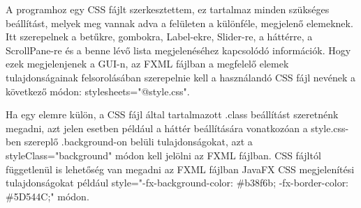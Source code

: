 A programhoz egy CSS fájlt szerkesztettem, ez tartalmaz minden szükséges beállítást, melyek meg vannak adva a felületen a különféle, megjelenő elemeknek. Itt szerepelnek a betűkre, gombokra, Label-ekre, Slider-re, a háttérre, a ScrollPane-re és a benne lévő lista megjelenéséhez kapcsolódó információk. Hogy ezek megjelenjenek a GUI-n, az FXML fájlban a megfelelő elemek tulajdonságainak felsorolásában szerepelnie kell a használandó CSS fájl nevének a következő módon: stylesheets="@style.css". 

Ha egy elemre külön, a CSS fájl által tartalmazott .class beállítást szeretnénk megadni, azt jelen esetben például a háttér beállítására vonatkozóan a style.css-ben szereplő .background{}-on belüli tulajdonságokat, azt a styleClass="background" módon kell jelölni az FXML fájlban. CSS fájltól függetlenül is lehetőség van megadni az FXML fájlban JavaFX CSS megjelenítési tulajdonságokat például style="-fx-background-color: \#b38f6b; -fx-border-color: \#5D544C;" módon. 
